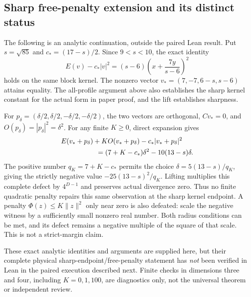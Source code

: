 \subsection{Sharp free-penalty extension and its distinct status}\label{sec:cycle-sharp}
The following is an analytic continuation, outside the paired Lean result.
Put $s=\sqrt{85}$ and $c_*=(17-s)/2$. Since $9<s<10$, the exact identity
\[
 E(v)-c_*|v|^2=(s-6)\left(x+\frac{7y}{s-6}\right)^2
\]
holds on the same block kernel. The nonzero vector
$v_*=(7,-7,6-s,s-6)$ attains equality. The all-profile argument above
also establishes the sharp kernel constant for the actual form in paper
proof, and the lift establishes sharpness.

For $p_\delta=(\delta/2,\delta/2,-\delta/2,-\delta/2)$, the two vectors
are orthogonal, $Cv_*=0$, and $O(p_\delta)=|p_\delta|^2=\delta^2$.
For any finite $K\geq0$, direct expansion gives
\begin{align*}
 &E(v_*+p_\delta)+K O(v_*+p_\delta)-c_*|v_*+p_\delta|^2\\
 &\hspace{18mm}=(7+K-c_*)\delta^2-10(13-s)\delta.
\end{align*}
The positive number $q_K=7+K-c_*$ permits the choice
$\delta=5(13-s)/q_K$, giving the strictly negative value
$-25(13-s)^2/q_K$. Lifting multiplies this complete defect by
$4^{D-1}$ and preserves actual divergence zero. Thus no finite quadratic
penalty repairs this same observation at the sharp kernel endpoint.
A penalty $\Phi(z)\leq K\|z\|^2$ only near zero is also defeated:
scale the negative witness by a sufficiently small nonzero real number.
Both radius conditions can be met, and its defect remains a negative
multiple of the square of that scale. This is not a strict-margin claim.

These exact analytic identities and arguments are supplied here, but their
complete physical sharp-endpoint/free-penalty statement has \emph{not}
been verified in Lean in the paired execution described next. Finite
checks in dimensions three and four, including $K=0,1,100$, are diagnostics
only, not the universal theorem or independent review.

